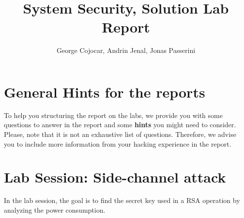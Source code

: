 \documentclass[a4paper,11pt]{article}
\title{System Security,
\ifsolution Solution \else \fi
Lab Report}
\author{George Cojocar, Andrin Jenal, Jonas Passerini}
\begin{document}
\maketitle

\section{General Hints for the reports}

To help you structuring the report on the labs, we provide you with some
questions to answer in the report and some \textbf{hints} you might need to
consider. Please, note that it is not an exhaustive list of questions.
Therefore, we advise you to include more information from your hacking
experience in the report.

\section{Lab Session: Side-channel attack}
In the lab session, the goal is to find the secret key used in a RSA
operation by analyzing the power consumption.
\end{document}
